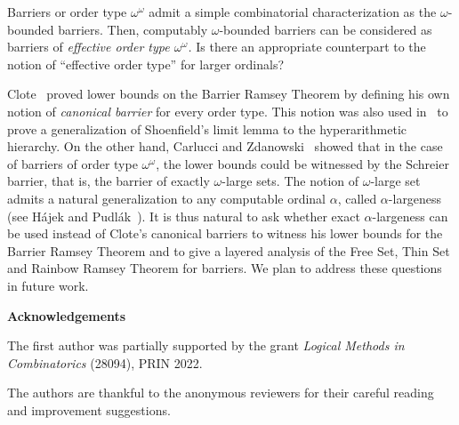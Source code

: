 \documentclass{article}
\def\qt#1{``#1''}%
\numberwithin{theorem}{section}
\newcommand{\ludovic}[1]{\textcolor{blue}{#1}}
\newcommand{\lorenzo}[1]{\textcolor{orange}{#1}}
\begin{document}
Barriers or order type $\omega^\omega$ admit a simple combinatorial characterization as the $\omega$-bounded barriers. Then, computably $\omega$-bounded barriers can be considered as barriers of \emph{effective order type $\omega^\omega$.} Is there an appropriate counterpart to the notion of \qt{effective order type} for larger ordinals?

Clote~\cite{clote1984recursion} proved lower bounds on the Barrier Ramsey Theorem by defining his own notion of \emph{canonical barrier} for every order type. This notion was also used in~\cite{clote1986generalization} to prove a generalization of Shoenfield's limit lemma to the hyperarithmetic hierarchy. On the other hand, Carlucci and Zdanowski~\cite{carlucci2014strength} showed that in the case of barriers of order type $\omega^\omega$, the lower bounds could be witnessed by the Schreier barrier, that is, the barrier of exactly $\omega$-large sets. The notion of $\omega$-large set admits a natural generalization to any computable ordinal $\alpha$, called $\alpha$-largeness
(see H\'ajek and Pudl\'ak~\cite{hajek1998metamathematics}). It is thus natural to ask whether exact $\alpha$-largeness can be used instead of Clote's canonical barriers to witness his lower bounds for the Barrier Ramsey Theorem and to give a layered analysis of the Free Set, Thin Set and Rainbow Ramsey Theorem for barriers. We plan to address these questions in future work. 







\bigskip
\begin{center}
\textbf{Acknowledgements}
\end{center}
The first author was partially supported by the grant {\em Logical Methods in Combinatorics} (28094), PRIN 2022.

The authors are thankful to the anonymous reviewers for their careful reading and improvement suggestions.



\end{document}
